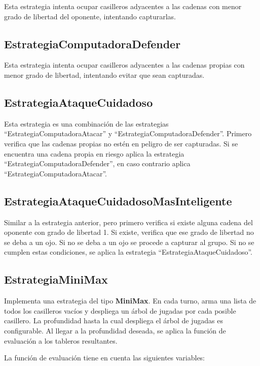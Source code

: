 \documentclass[11pt]{article}
\begin{document}
    Esta estrategia intenta ocupar casilleros adyacentes a las cadenas
    con menor grado de libertad del oponente, intentando capturarlas.
\subsection{EstrategiaComputadoraDefender}
\label{sec-4.3.2}

    Esta estrategia intenta ocupar casilleros adyacentes a las cadenas
    propias con menor grado de libertad, intentando evitar que sean
    capturadas.
\subsection{EstrategiaAtaqueCuidadoso}
\label{sec-4.3.3}

    Esta estrategia es una combinación de las estrategias
    ``EstrategiaComputadoraAtacar'' y
    ``EstrategiaComputadoraDefender''. Primero verifica que las
    cadenas propias no estén en peligro de ser capturadas. Si se
    encuentra una cadena propia en riesgo aplica la estrategia
    ``EstrategiaComputadoraDefender'', en caso contrario aplica
    ``EstrategiaComputadoraAtacar''.
\subsection{EstrategiaAtaqueCuidadosoMasInteligente}
\label{sec-4.3.4}

    Similar a la estrategia anterior, pero primero verifica si existe
    alguna cadena del oponente con grado de libertad 1. Si existe,
    verifica que ese grado de libertad no se deba a un ojo. Si no se
    deba a un ojo se procede a capturar al grupo. Si no se cumplen
    estas condiciones, se aplica la estrategia
    ``EstrategiaAtaqueCuidadoso''.

\subsection{EstrategiaMiniMax}
\label{sec-4.3.5}
   Implementa una estrategia del tipo {\bf MiniMax}. En cada turno,
   arma una lista de todos los casilleros vac\'ios y despliega un
   \'arbol de jugadas por cada posible casillero. La profundidad hasta
   la cual despliega el \'arbol de jugadas es configurable. Al llegar a
   la profundidad deseada, se aplica la funci\'on de evaluaci\'on a
   los tableros resultantes.
   
   La funci\'on de evaluaci\'on tiene en cuenta las siguientes
   variables:
   
\end{document}
